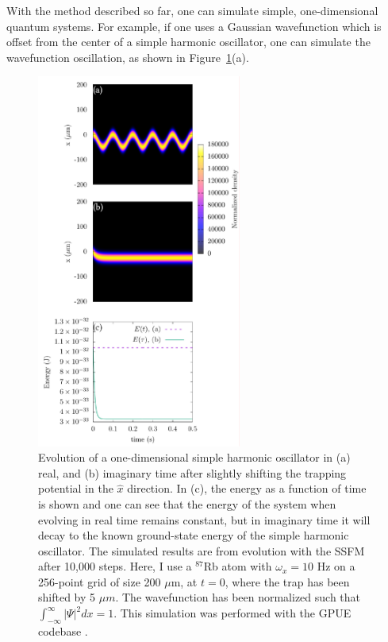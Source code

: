 With the method described so far, one can simulate simple, one-dimensional quantum systems.
For example, if one uses a Gaussian wavefunction which is offset from the center of a simple harmonic oscillator, one can simulate the wavefunction oscillation, as shown in Figure~\ref{fig:evolve}(a).

\begin{figure}

\center \includegraphics[width=0.6\textwidth]{data/splitop/SHO/SHO_gimp.pdf}

\caption{Evolution of a one-dimensional simple harmonic oscillator in (a) real, and (b) imaginary time after slightly shifting the trapping potential in the $\hat x$ direction.
In (c), the energy as a function of time is shown and one can see that the energy of the system when evolving in real time remains constant, but in imaginary time it will decay to the known ground-state energy of the simple harmonic oscillator.
The simulated results are from evolution with the SSFM after 10,000 steps.
Here, I use a $^{87}$Rb atom with $\omega_x = 10$ Hz on a 256-point grid of size 200 $\mu$m, at $t = 0$, where the trap has been shifted by 5 $\mu m$.
The wavefunction has been normalized such that $\int_{-\infty}^\infty|\Psi|^2 dx = 1$.
This simulation was performed with the GPUE codebase \cite{schloss2018}.}
\label{fig:evolve}
\end{figure}

